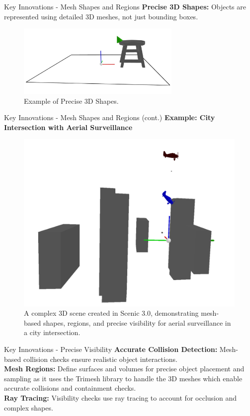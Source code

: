 \documentclass[10pt]{beamer}
\begin{document}
\begin{frame}{Key Innovations - Mesh Shapes and Regions}
    \textbf{Precise 3D Shapes:} Objects are represented using detailed 3D meshes, not just bounding boxes.
\begin{figure}
\centering
\includegraphics[width=0.7\textwidth]{3d.jpg}
\caption{Example of Precise 3D Shapes.}
\label{fig:3d}
\end{figure}
\end{frame}

\begin{frame}{Key Innovations - Mesh Shapes and Regions (cont.)}
    \textbf{Example: City Intersection with Aerial Surveillance}

    \begin{figure}
        \centering
        \includegraphics[width=0.65\linewidth]{City_Intersection_with_Aerial_Surveillance.png} 
        \caption{A complex 3D scene created in Scenic 3.0, demonstrating mesh-based shapes, regions, and precise visibility for aerial surveillance in a city intersection.}
        \label{fig:city-intersection}
    \end{figure}
\end{frame}

\begin{frame}{Key Innovations - Precise Visibility}
    \textbf{Accurate Collision Detection:} Mesh-based collision checks ensure realistic object interactions.\\
    \textbf{Mesh Regions:} Define surfaces and volumes for precise object placement and sampling as it uses the Trimesh library to handle the 3D meshes which enable accurate collisions and containment checks.\\
    \textbf{Ray Tracing:} Visibility checks use ray tracing to account for occlusion and complex shapes.
\end{frame}
\end{document}
